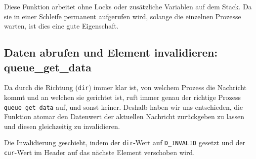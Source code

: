 \documentclass[12pt, a4paper]{scrartcl}
\begin{document}
Diese Funktion arbeitet ohne Locks oder zusätzliche Variablen auf dem Stack. Da
sie in einer Schleife permanent aufgerufen wird, solange die einzelnen Prozesse
warten, ist dies eine gute Eigenschaft.

\subsection{Daten abrufen und Element invalidieren: queue\_get\_data}

Da durch die Richtung (\texttt{dir}) immer klar ist, von welchem Prozess die
Nachricht kommt und an welchen sie gerichtet ist, ruft immer genau der richtige
Prozess \texttt{queue\_\-get\_\-data} auf, und sonst keiner. Deshalb haben wir uns
entschieden, die Funktion atomar den Datenwert der aktuellen Nachricht
zurückgeben zu lassen und diesen gleichzeitig zu invalidieren.
\np

Die Invalidierung geschieht, indem der \texttt{dir}-Wert auf
\texttt{D\_INVALID} gesetzt und der \texttt{cur}-Wert im Header auf das nächste
Element verschoben wird.
\end{document}
